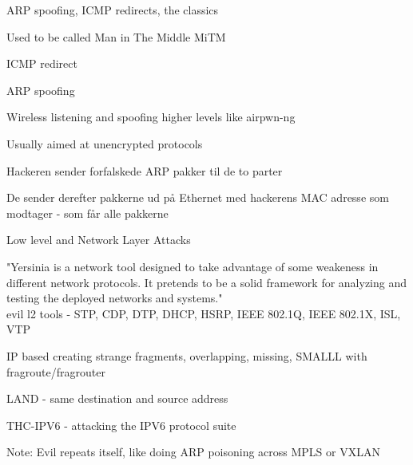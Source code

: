 \documentclass[Screen16to9,17pt]{foils}
\begin{document}

\begin{list1}
\item ARP spoofing, ICMP redirects, the classics
\item Used to be called Man in The Middle MiTM
\begin{list2}
\item ICMP redirect
\item ARP spoofing
\item Wireless listening and spoofing higher levels like  airpwn-ng 
\end{list2}
\item Usually aimed at unencrypted protocols

\end{list1}




\begin{list1}
\item Hackeren sender forfalskede ARP pakker til de to parter
\item De sender derefter pakkerne ud på Ethernet med hackerens MAC
  adresse som modtager - som får alle pakkerne
\end{list1}




\begin{list1}
\item Low level and Network Layer Attacks
\begin{list2}
\item "Yersinia is a network tool designed to take advantage of some weakeness in different network protocols. It pretends to be a solid framework for analyzing and testing the deployed networks and systems."\\
evil l2 tools - STP, CDP, DTP, DHCP, HSRP, IEEE 802.1Q, IEEE 802.1X, ISL, VTP\\
\item IP based creating strange fragments, overlapping, missing, SMALLL with fragroute/fragrouter
\item LAND - same destination and source address
\item THC-IPV6 - attacking the IPV6 protocol suite
\end{list2}
\item Note: Evil repeats itself, like doing ARP poisoning across MPLS or VXLAN
\end{list1}
\end{document}
